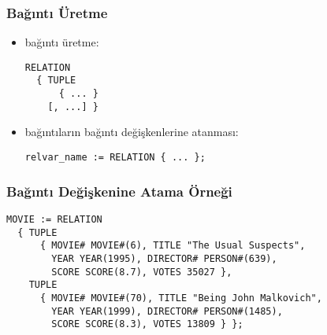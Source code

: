 \documentclass[dvipsnames]{beamer}
\theoremstyle{plain}
\begin{document}
\begin{frame}[fragile]
  \frametitle{Bağıntı Üretme}

  \begin{itemize}
    \item bağıntı üretme:
    \begin{lstlisting}
RELATION
  { TUPLE
      { ... }
    [, ...] }
    \end{lstlisting}

    \item bağıntıların bağıntı değişkenlerine atanması:
    \begin{lstlisting}
relvar_name := RELATION { ... };
    \end{lstlisting}
  \end{itemize}
\end{frame}

\begin{frame}[fragile]
  \frametitle{Bağıntı Değişkenine Atama Örneği}

  \begin{lstlisting}
MOVIE := RELATION
  { TUPLE
      { MOVIE# MOVIE#(6), TITLE "The Usual Suspects",
        YEAR YEAR(1995), DIRECTOR# PERSON#(639),
        SCORE SCORE(8.7), VOTES 35027 },
    TUPLE
      { MOVIE# MOVIE#(70), TITLE "Being John Malkovich",
        YEAR YEAR(1999), DIRECTOR# PERSON#(1485),
        SCORE SCORE(8.3), VOTES 13809 } };
  \end{lstlisting}
\end{frame}

%
%
%
\end{document}
